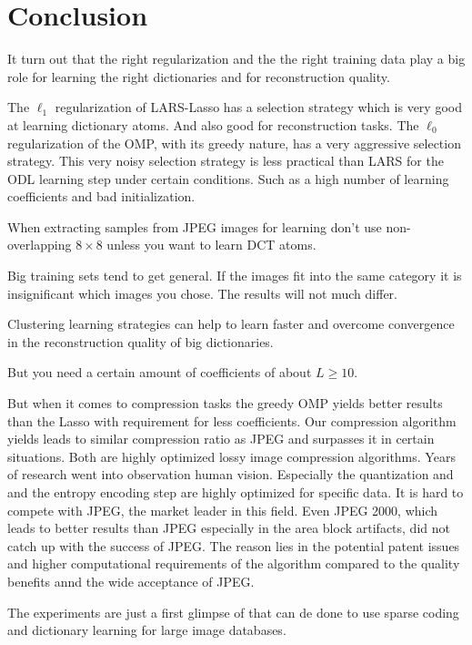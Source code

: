 \chapter{Conclusion}
It turn out that the right regularization and the the right training data
play  a big role for learning the right dictionaries and for reconstruction
quality. 

The $\ell_1$ regularization of LARS-Lasso has a selection strategy
which is very good at learning dictionary atoms. And also good for
reconstruction tasks.  The $\ell_0$ regularization of the OMP, with its greedy
nature, has a very aggressive selection strategy.  This very noisy selection
strategy is less practical than LARS for the ODL learning step under certain
conditions. Such as a high number of learning coefficients and bad
initialization.



When extracting samples from JPEG images for
learning don't use non-overlapping $8 \times 8$ unless you want to learn DCT
atoms. 

Big training sets tend to get general. If the images fit into the same category
it is insignificant which images you chose. The results will not much differ.

Clustering learning strategies can help to learn faster and overcome
convergence in the reconstruction quality of big dictionaries.


But you need a certain amount of coefficients of about $L \ge 10$.

But when it comes to compression tasks the greedy OMP yields better results
than the Lasso with requirement for less coefficients. 
Our compression algorithm yields leads to similar compression ratio as JPEG
and surpasses it in certain situations. Both are highly optimized lossy image
compression algorithms.  Years of research went into observation human vision. 
Especially the quantization and and the entropy encoding step are highly
optimized for specific data. It is hard to compete with JPEG, the market leader
in this field.  Even JPEG 2000, which leads to better results than JPEG
especially in the area block artifacts, did not catch up with the success of
JPEG.  The reason lies in the potential patent issues and higher computational
requirements of the algorithm compared to the quality benefits annd the wide
acceptance of JPEG.


The experiments are just a first glimpse of that can de done to use sparse
coding and dictionary learning for large image databases.



